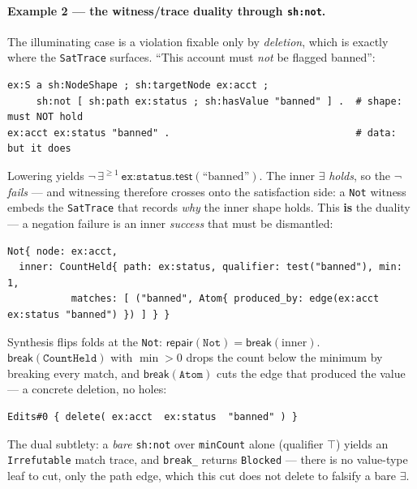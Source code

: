 \documentclass[11pt]{article}
\newcommand{\test}{\mathsf{test}}
\newcommand{\Repair}{\mathsf{repair}}
\newcommand{\Break}{\mathsf{break}}
\newcommand{\code}[1]{\texttt{#1}}
\theoremstyle{definition}
\begin{document}
\paragraph{Example 2 --- the witness/trace duality through \code{sh:not}.} The
illuminating case is a violation fixable only by \emph{deletion}, which is exactly
where the \code{SatTrace} surfaces. ``This account must \emph{not} be flagged
banned'':
\begin{lstlisting}[language={}]
ex:S a sh:NodeShape ; sh:targetNode ex:acct ;
     sh:not [ sh:path ex:status ; sh:hasValue "banned" ] .  # shape: must NOT hold
ex:acct ex:status "banned" .                                # data:  but it does
\end{lstlisting}
Lowering yields
$\neg\,\exists^{\geq 1}\,\code{ex:status}.\test(\text{``banned''})$. The inner
$\exists$ \emph{holds}, so the $\neg$ \emph{fails} --- and witnessing therefore
crosses onto the satisfaction side: a \code{Not} witness embeds the \code{SatTrace}
that records \emph{why} the inner shape holds. This \textbf{is} the duality --- a
negation failure is an inner \emph{success} that must be dismantled:
\begin{lstlisting}[language={}]
Not{ node: ex:acct,
  inner: CountHeld{ path: ex:status, qualifier: test("banned"), min: 1,
           matches: [ ("banned", Atom{ produced_by: edge(ex:acct ex:status "banned") }) ] } }
\end{lstlisting}
Synthesis flips folds at the \code{Not}: $\Repair(\code{Not})=\Break(\text{inner})$.
$\Break(\code{CountHeld})$ with $\min>0$ drops the count below the minimum by
breaking every match, and $\Break(\code{Atom})$ cuts the edge that produced the
value --- a concrete deletion, no holes:
\begin{lstlisting}[language={}]
Edits#0 { delete( ex:acct  ex:status  "banned" ) }
\end{lstlisting}
The dual subtlety: a \emph{bare} \code{sh:not} over \code{minCount} alone
(qualifier $\top$) yields an \code{Irrefutable} match trace, and \code{break\_}
returns \code{Blocked} --- there is no value-type leaf to cut, only the path edge,
which this cut does not delete to falsify a bare $\exists$.
\end{document}
